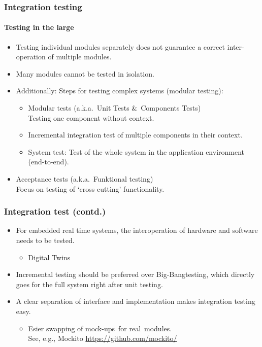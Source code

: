 

\begin{frame}
\frametitle{Integration testing}
\framesubtitle{Testing in the large}
\begin{itemize}
  \item Testing individual modules separately does not guarantee a correct inter-operation of multiple modules.
  \item Many modules cannot be tested in isolation.
  \item Additionally: Steps for testing complex systems (modular testing):
    \begin{itemize}
      \item Modular tests (a.k.a.\ Unit Tests \&\ Components Tests)\\
			Testing one component without context.
      \item Incremental integration test of multiple components in their context.
      \item System test: Test of the whole system in the application environment (end-to-end).
    \end{itemize}
	\item Acceptance tests (a.k.a.\ Funktional testing)\\
Focus on testing of `cross cutting' functionality.
\end{itemize}
\end{frame}


\begin{frame}
\frametitle{Integration test (contd.)}
\begin{itemize}
  \item For embedded real time systems, the interoperation of hardware and software needs to be tested.
	\begin{itemize}
		\item Digital Twins
	\end{itemize}
  \item Incremental testing should be preferred over \glq Big-Bang\grq testing, which directly goes for the full system right after unit testing.
  \item A clear separation of interface and implementation makes integration testing easy.
    \begin{itemize}
      \item Esier swapping of \glq mock-ups\grq\ for \glq real\grq\ modules.\\
			See, e.g., Mockito \url{https://github.com/mockito/}
    \end{itemize}
\end{itemize}
\end{frame}

